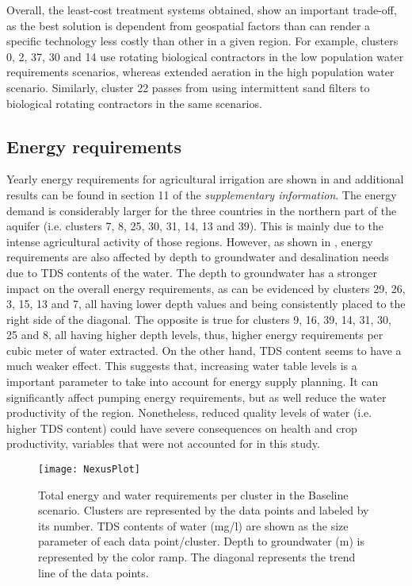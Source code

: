 Overall, the least-cost treatment systems obtained, show an important trade-off, as the best solution is dependent from geospatial factors than can render a specific technology less costly than other in a given region. For example, clusters 0, 2, 37, 30 and 14 use rotating biological contractors in the low population water requirements scenarios, whereas extended aeration in the high population water scenario. Similarly, cluster 22 passes from using intermittent sand filters to biological rotating contractors in the same scenarios.

\subsection{Energy requirements}
Yearly energy requirements for agricultural irrigation are shown in  and additional results can be found in section 11 of the \textit{supplementary information}. The energy demand is considerably larger for the three countries in the northern part of the aquifer (i.e. clusters 7,  8, 25, 30, 31, 14, 13 and 39). This is mainly due to the intense agricultural activity of those regions. However, as shown in , energy requirements are also affected by depth to groundwater and desalination needs due to TDS contents of the water. The depth to groundwater has a stronger impact on the overall energy requirements, as can be evidenced by clusters 29, 26, 3, 15, 13 and 7, all having lower depth values and being consistently placed to the right side of the diagonal. The opposite is true for clusters 9, 16, 39, 14, 31, 30, 25 and 8, all having higher depth levels, thus, higher energy requirements per cubic meter of water extracted. On the other hand, TDS content seems to have a much weaker effect. This suggests that, increasing water table levels is a important parameter to take into account for energy supply planning. It can significantly affect pumping energy requirements, but as well reduce the water productivity of the region. Nonetheless, reduced quality levels of water (i.e. higher TDS content) could have severe consequences on health and crop productivity, variables that were not accounted for in this study.

\begin{figure*}[!t]
	\centering
	\texttt{[image: NexusPlot]}
	\caption{Total energy and water requirements per cluster in the Baseline scenario. Clusters are represented by the data points and labeled by its number. TDS contents of water (mg/l) are shown as the size parameter of each data point/cluster. Depth to groundwater (m) is represented by the color ramp. The diagonal represents the trend line of the data points.}
	\label{fig:energyclusters}
\end{figure*}

